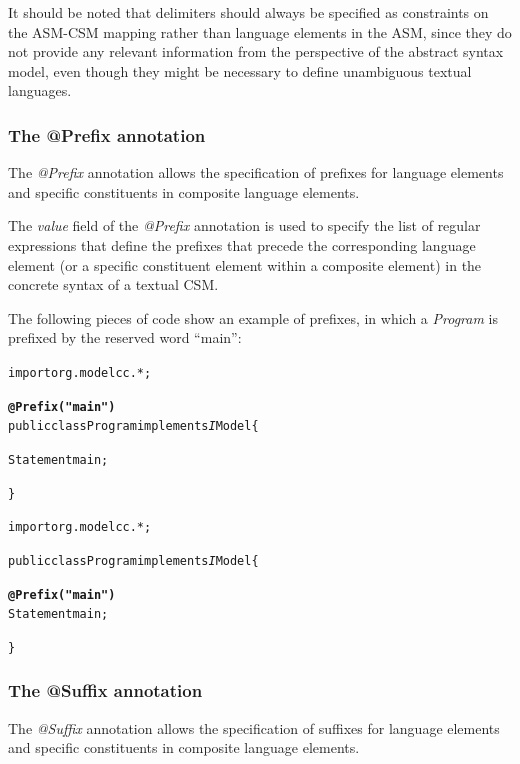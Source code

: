 \documentclass[a4paper,twoside,onecolumn]{article}
\newenvironment{colframe}{%
  \begin{Sbox} 
    \begin{minipage}{.8\columnwidth} 
}{%

  \end{minipage} 
  \end{Sbox} 
  \begin{center} 
    \fcolorbox{black}{MyGray}{\TheSbox} 
  \end{center} 
}
\newcommand{\an}[1]{\emph{#1}} %
\begin{document}
It should be noted that delimiters should always be specified as constraints on the ASM-CSM mapping rather than language elements in the ASM,
since they do not provide any relevant information from the perspective of the abstract syntax model, even though they might be necessary to
define unambiguous textual languages.

\subsubsection{The @Prefix annotation}

The \an{@Prefix} annotation allows the specification of prefixes for language elements and specific constituents in composite language elements.

The \emph{value} field of the \an{@Prefix} annotation is used to specify the list of regular expressions that define the prefixes that precede
the corresponding language element (or a specific constituent element within a composite element) in the concrete syntax of a textual CSM.

The following pieces of code show an example of prefixes, in which a \emph{Program} is prefixed by the reserved word ``main'':

\begin{colframe}
\begin{alltt}
import org.modelcc.*;

{\bf\unskip @Prefix("main")}
public class Program implements{\emph IModel} \{

  Statement main;

\}
\end{alltt}
\end{colframe}

\begin{colframe}
\begin{alltt}
import org.modelcc.*;

public class Program implements{\emph IModel} \{

  {\bf\unskip @Prefix("main")}
  Statement main;

\}
\end{alltt}
\end{colframe}

\subsubsection{The @Suffix annotation}

The \an{@Suffix} annotation allows the specification of suffixes for language elements and specific constituents in composite language elements.
\end{document}
